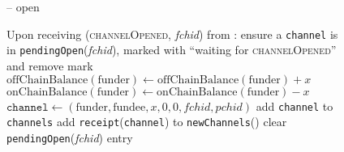 \begin{figure}[H]
\begin{systembox}{\fpaynet{} -- open}
\begin{algorithmic}[1]
      \State Upon receiving (\textsc{channelOpened}, \textit{fchid}) from
      \simulator:
      \Indent
        \State ensure a \texttt{channel} is in
        \texttt{pendingOpen}(\textit{fchid}), marked with ``waiting for
        \textsc{channelOpened}'' and remove mark
        \State $\mathrm{offChainBalance}\left(\mathrm{funder}\right) \gets
        \mathrm{offChainBalance}\left(\mathrm{funder}\right) + x$
        \label{alg:fpaynet:channelOpened:offchain}
        \State $\mathrm{onChainBalance}\left(\mathrm{funder}\right) \gets
        \mathrm{onChainBalance}\left(\mathrm{funder}\right) - x$
        \label{alg:fpaynet:channelOpened:onchain}
        \State $\mathtt{channel} \gets \left(\mathrm{funder}, \mathrm{fundee},
        x, 0, 0, \mathit{fchid}, \mathit{pchid}\right)$
        \State add \texttt{channel} to \texttt{channels}
        \State add \texttt{receipt}(\texttt{channel}) to
        \texttt{newChannels}(\alice)
        \label{alg:fpaynet:channelOpened:report}
        \State clear \texttt{pendingOpen}(\textit{fchid}) entry
      \EndIndent
    \end{algorithmic}
  \end{systembox}
  \caption{}
  \label{alg:fpaynet:open}
\end{figure}


